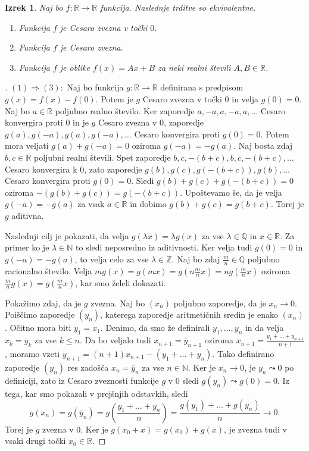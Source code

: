 \documentclass[a4paper,12pt]{article}
\theoremstyle{definition}
\theoremstyle{plain}
\newtheorem{izrek}{Izrek}
\newenvironment{dokaz}{\begin{proof}[\bfseries\upshape\proofname]}{\end{proof}}
\begin{document}
\begin{izrek}
    Naj bo $f: \mathbb{R} \rightarrow \mathbb{R}$ funkcija. Naslednje trditve so ekvivalentne.
    \begin{enumerate}
        \item Funkcija $f$ je Cesaro zvezna v točki $0$.
        \item Funkcija $f$ je Cesaro zvezna.
        \item Funkcija $f$ je oblike $f(x) = Ax + B$ za neki realni števili $A, B \in \mathbb{R}$.
    \end{enumerate}
\end{izrek}
\begin{dokaz}
    $(1) \Rightarrow (3): $ Naj bo funkcija $g: \mathbb{R} \rightarrow \mathbb{R}$ definirana s predpisom $g(x) = f(x) - f(0)$. Potem je $g$ Cesaro zvezna v točki $0$ in velja $g(0) = 0$. 
    Naj bo $a \in \mathbb{R}$ poljubno realno število. Ker zaporedje $a, -a, a, -a, a, \ldots$ Cesaro konvergira proti $0$ in je $g$ Cesaro zvezna v $0$, zaporedje $g(a), g(-a), g(a), g(-a), \ldots$ Cesaro konvergira proti $g(0) = 0$. Potem mora veljati $g(a) + g(-a) = 0$ oziroma $g(-a) = -g(a)$. 
    Naj bosta zdaj $b, c \in \mathbb{R}$ poljubni realni števili. Spet zaporedje $b, c, -(b+c), b, c, -(b+c), \ldots$ Cesaro konvergira k $0$, zato zaporedje $g(b), g(c), g(-(b+c)), g(b), \ldots$ Cesaro konvergira proti $g(0) = 0$. Sledi $g(b) + g(c) + g(-(b+c)) = 0$ oziroma $-(g(b) + g(c)) = g(-(b+c))$. Upoštevamo še, da je velja $g(-a) = -g(a)$ za vsak $a \in \mathbb{R}$ in dobimo $g(b) + g(c) = g(b+c)$. Torej je $g$ aditivna.

    Naslednji cilj je pokazati, da velja $g(\lambda x) = \lambda g(x)$ za vse $\lambda \in \mathbb{Q}$ in $x \in \mathbb{R}$. Za primer ko je $\lambda \in \mathbb{N}$ to sledi neposredno iz aditivnosti. Ker velja tudi $g(0) = 0$ in $g(-a) = -g(a)$, to velja celo za vse $\lambda \in \mathbb{Z}$. Naj bo zdaj $\frac{m}{n} \in \mathbb{Q}$ poljubno racionalno število. Velja $mg(x) = g(mx) = g(n\frac{m}{n}x) = ng(\frac{m}{n}x)$ oziroma $\frac{m}{n}g(x) = g(\frac{m}{n}x)$, kar smo želeli dokazati.

    Pokažimo zdaj, da je $g$ zvezna. Naj bo $(x_n)$ poljubno zaporedje, da je $x_n \rightarrow 0$. Poiščimo zaporedje $(y_n)$, katerega zaporedje aritmetičnih sredin je enako $(x_n)$. Očitno mora biti $y_1 = x_1$. Denimo, da smo že definirali $y_1, \ldots, y_n$ in da velja $x_k = \overline{y}_k$ za vse $k \leq n$. Da bo veljalo tudi $x_{n+1} = \overline{y}_{n+1}$ oziroma $x_{n+1} = \frac{y_1 + \ldots + y_{n+1}}{n+1}$, moramo vzeti $y_{n+1} = (n+1)x_{n+1} - (y_1 + \ldots + y_n)$. Tako definirano zaporedje $(y_n)$ res zadošča $x_n = \overline{y}_n$ za vse $n \in \mathbb{N}$. Ker je $x_n \rightarrow 0$, je $y_n \leadsto 0$ po definiciji, zato iz Cesaro zveznosti funkcije $g$ v $0$ sledi $g(y_n) \leadsto g(0) = 0$. Iz tega, kar smo pokazali v prejšnjih odstavkih, sledi 
    $$g(x_n) = g(\overline{y}_n) = g(\frac{y_1 + \ldots + y_n}{n}) = \frac{g(y_1) + \ldots + g(y_n)}{n} \rightarrow 0.$$
    Torej je $g$ zvezna v $0$. Ker je $g(x_0 + x) = g(x_0) + g(x)$, je zvezna tudi v vsaki drugi točki $x_0 \in \mathbb{R}$.


\end{dokaz}
\end{document}
